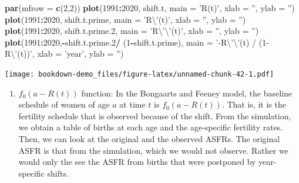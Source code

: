 \documentclass[]{book}
\newenvironment{Shaded}{\begin{snugshade}}{\end{snugshade}}
\newcommand{\CharTok}[1]{\textcolor[rgb]{0.31,0.60,0.02}{#1}}
\newcommand{\DataTypeTok}[1]{\textcolor[rgb]{0.13,0.29,0.53}{#1}}
\newcommand{\DecValTok}[1]{\textcolor[rgb]{0.00,0.00,0.81}{#1}}
\newcommand{\FloatTok}[1]{\textcolor[rgb]{0.00,0.00,0.81}{#1}}
\newcommand{\KeywordTok}[1]{\textcolor[rgb]{0.13,0.29,0.53}{\textbf{#1}}}
\newcommand{\NormalTok}[1]{#1}
\newcommand{\OperatorTok}[1]{\textcolor[rgb]{0.81,0.36,0.00}{\textbf{#1}}}
\newcommand{\StringTok}[1]{\textcolor[rgb]{0.31,0.60,0.02}{#1}}
\providecommand{\tightlist}{%
  \setlength{\itemsep}{0pt}\setlength{\parskip}{0pt}}
\begin{document}
\begin{enumerate}
\begin{Shaded}
\begin{Highlighting}[]
\KeywordTok{par}\NormalTok{(}\DataTypeTok{mfrow =} \KeywordTok{c}\NormalTok{(}\DecValTok{2}\NormalTok{,}\DecValTok{2}\NormalTok{))}
\KeywordTok{plot}\NormalTok{(}\DecValTok{1991}\OperatorTok{:}\DecValTok{2020}\NormalTok{, shift.t, }\DataTypeTok{main =} \StringTok{'R(t)'}\NormalTok{, }\DataTypeTok{xlab =} \StringTok{''}\NormalTok{, }\DataTypeTok{ylab =} \StringTok{''}\NormalTok{)}
\KeywordTok{plot}\NormalTok{(}\DecValTok{1991}\OperatorTok{:}\DecValTok{2020}\NormalTok{, shift.t.prime, }\DataTypeTok{main =} \StringTok{'R}\CharTok{\textbackslash{}'}\StringTok{(t)'}\NormalTok{, }\DataTypeTok{xlab =} \StringTok{''}\NormalTok{, }\DataTypeTok{ylab =} \StringTok{''}\NormalTok{)}
\KeywordTok{plot}\NormalTok{(}\DecValTok{1991}\OperatorTok{:}\DecValTok{2020}\NormalTok{, shift.t.prime}\FloatTok{.2}\NormalTok{, }\DataTypeTok{main =} \StringTok{'R}\CharTok{\textbackslash{}'\textbackslash{}'}\StringTok{(t)'}\NormalTok{, }\DataTypeTok{xlab =} \StringTok{''}\NormalTok{, }\DataTypeTok{ylab =} \StringTok{''}\NormalTok{)}
\KeywordTok{plot}\NormalTok{(}\DecValTok{1991}\OperatorTok{:}\DecValTok{2020}\NormalTok{,}\OperatorTok{-}\NormalTok{shift.t.prime}\FloatTok{.2}\OperatorTok{/}\StringTok{ }\NormalTok{(}\DecValTok{1}\OperatorTok{-}\NormalTok{shift.t.prime), }\DataTypeTok{main =} \StringTok{'-R}\CharTok{\textbackslash{}'\textbackslash{}'}\StringTok{(t) / (1- R}\CharTok{\textbackslash{}'}\StringTok{(t))'}\NormalTok{, }\DataTypeTok{xlab =} \StringTok{'year'}\NormalTok{, }\DataTypeTok{ylab =} \StringTok{''}\NormalTok{)}
\end{Highlighting}
\end{Shaded}

  \texttt{[image: bookdown-demo\_files/figure-latex/unnamed-chunk-42-1.pdf]}

  \begin{enumerate}
  \def\labelenumii{\alph{enumii}.}
  \setcounter{enumii}{1}
  \tightlist
  \item
    \(f_0(a-R(t))\) function:
    In the Bongaarts and Feeney model, the baseline schedule of women of age \(a\) at time \(t\) is \(f_0(a-R(t))\). That is, it is the fertility schedule that is observed because of the shift. From the simulation, we obtain a table of births at each age and the age-specific fertility rates. Then, we can look at the original and the observed ASFRs. The original ASFR is that from the simulation, which we would not observe. Rather we would only the see the ASFR from births that were postponed by year-specific shifts.
  \end{enumerate}


\end{enumerate}
\end{document}
